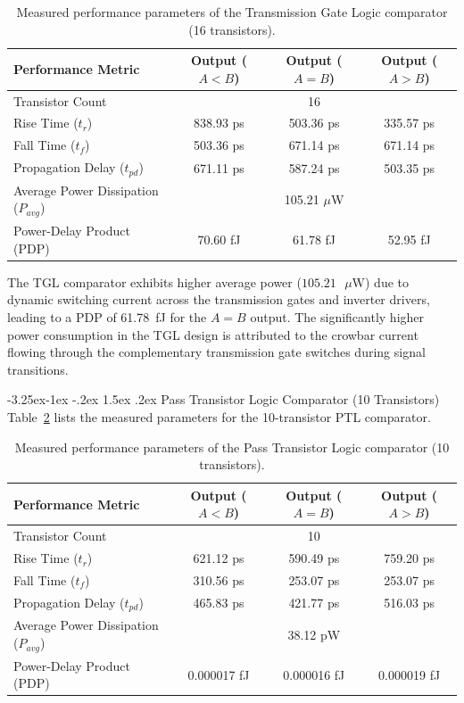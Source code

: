\documentclass[12pt,a4paper,oneside]{report}
\makeatletter
\renewcommand\subsection{\@startsection{subsection}{2}{\z@}%
                                     {-3.25ex\@plus -1ex \@minus -.2ex}%
                                     {1.5ex \@plus .2ex}%
                                     {\normalfont\normalsize\bfseries\itshape}}
\makeatother
\begin{document}
\begin{table}[H]
\centering
\caption{Measured performance parameters of the Transmission Gate Logic comparator (16 transistors).}
\label{tab:res_tg_full}
\vspace{0.2cm}
\begin{tabular}{|l|c|c|c|}
\hline
\textbf{Performance Metric} & \textbf{Output ($A<B$)} & \textbf{Output ($A=B$)} & \textbf{Output ($A>B$)} \\
\hline
Transistor Count & \multicolumn{3}{c|}{16} \\
\hline
Rise Time ($t_r$) & 838.93 ps & 503.36 ps & 335.57 ps \\
\hline
Fall Time ($t_f$) & 503.36 ps & 671.14 ps & 671.14 ps \\
\hline
Propagation Delay ($t_{pd}$) & 671.11 ps & 587.24 ps & 503.35 ps \\
\hline
Average Power Dissipation ($P_{avg}$) & \multicolumn{3}{c|}{105.21 $\mu$W} \\
\hline
Power-Delay Product (PDP) & 70.60 fJ & 61.78 fJ & 52.95 fJ \\
\hline
\end{tabular}
\end{table}

The TGL comparator exhibits higher average power ($105.21\text{ }\mu\text{W}$) due to dynamic switching current across the transmission gates and inverter drivers, leading to a PDP of 61.78~fJ for the $A=B$ output. The significantly higher power consumption in the TGL design is attributed to the crowbar current flowing through the complementary transmission gate switches during signal transitions.

\subsection{Pass Transistor Logic Comparator (10 Transistors)}
Table~\ref{tab:res_pass_full} lists the measured parameters for the 10-transistor PTL comparator.

\begin{table}[H]
\centering
\caption{Measured performance parameters of the Pass Transistor Logic comparator (10 transistors).}
\label{tab:res_pass_full}
\vspace{0.2cm}
\begin{tabular}{|l|c|c|c|}
\hline
\textbf{Performance Metric} & \textbf{Output ($A<B$)} & \textbf{Output ($A=B$)} & \textbf{Output ($A>B$)} \\
\hline
Transistor Count & \multicolumn{3}{c|}{10} \\
\hline
Rise Time ($t_r$) & 621.12 ps & 590.49 ps & 759.20 ps \\
\hline
Fall Time ($t_f$) & 310.56 ps & 253.07 ps & 253.07 ps \\
\hline
Propagation Delay ($t_{pd}$) & 465.83 ps & 421.77 ps & 516.03 ps \\
\hline
Average Power Dissipation ($P_{avg}$) & \multicolumn{3}{c|}{38.12 pW} \\
\hline
Power-Delay Product (PDP) & 0.000017 fJ & 0.000016 fJ & 0.000019 fJ \\
\hline
\end{tabular}
\end{table}
\end{document}
